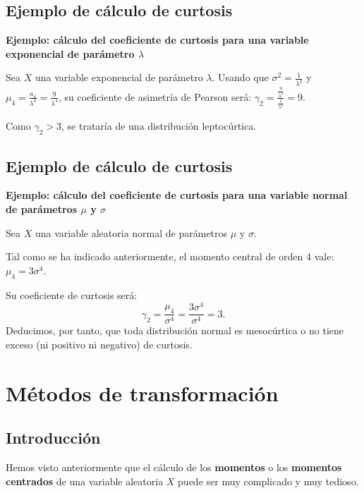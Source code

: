 \documentclass[]{book}
\begin{document}
\hypertarget{ejemplo-de-cuxe1lculo-de-curtosis-1}{%
\subsection{Ejemplo de cálculo de curtosis}\label{ejemplo-de-cuxe1lculo-de-curtosis-1}}

\textbf{Ejemplo: cálculo del coeficiente de curtosis para una variable exponencial de parámetro \(\lambda\)}

Sea \(X\) una variable exponencial de parámetro \(\lambda\).
Usando que \(\sigma^2=\frac{1}{\lambda^2}\) y \(\mu_4 =\frac{a_4}{\lambda^3}=\frac{9}{\lambda^4}\), su coeficiente de asimetría de Pearson será:
\(\gamma_2 = \frac{\frac{9}{\lambda^4}}{\frac{1}{\lambda^4}}=9.\)

Como \(\gamma_2 >3\), se trataría de una distribución leptocúrtica.

\hypertarget{ejemplo-de-cuxe1lculo-de-curtosis-2}{%
\subsection{Ejemplo de cálculo de curtosis}\label{ejemplo-de-cuxe1lculo-de-curtosis-2}}

\textbf{Ejemplo: cálculo del coeficiente de curtosis para una variable normal de parámetros \(\mu\) y \(\sigma\)}

Sea \(X\) una variable aleatoria normal de parámetros \(\mu\) y \(\sigma\).

Tal como se ha indicado anteriormente, el momento central de orden 4 vale: \(\mu_4 = 3\sigma^4\).

Su coeficiente de curtosis será:
\[
\gamma_2 =\frac{\mu_4}{\sigma^4}=\frac{3\sigma^4}{\sigma^4}=3.
\]
Deducimos, por tanto, que toda distribución normal es mesocúrtica o no tiene exceso (ni positivo ni negativo) de curtosis.

\hypertarget{muxe9todos-de-transformaciuxf3n}{%
\section{Métodos de transformación}\label{muxe9todos-de-transformaciuxf3n}}

\hypertarget{introducciuxf3n}{%
\subsection{Introducción}\label{introducciuxf3n}}

Hemos visto anteriormente que el cálculo de los \textbf{momentos} o los \textbf{momentos centrados} de una variable aleatoria \(X\) puede ser muy complicado y muy tedioso.
\end{document}
